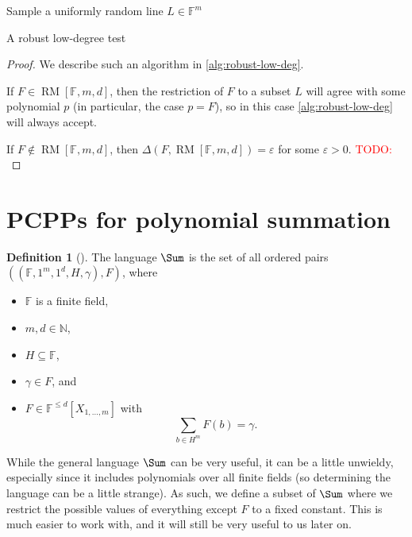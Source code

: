\documentclass[english,12pt]{reedthesis}
\theoremstyle{plain}
\theoremstyle{definition}
\newtheorem{defn}[defn]{Definition}
\theoremstyle{remark}
\DeclareMathOperator{\RM}{RM}
\DeclarePairedDelimiter{\abs}{\lvert}{\rvert}
\newcommand{\TODO}[1]{\textcolor{red}{TODO: #1}}
\begin{document}
\begin{algorithm}[htbp]
  \KwOut{Whether $F \in \RM[\mathbb{F}, m, d]$}
  Sample a uniformly random line $L \in \mathbb{F}^{m}$\;
  \caption{A robust low-degree test~\cite[Prop.\ 5.7]{Par21}}\label{alg:robust-low-deg}
\end{algorithm}

\begin{proof}
  We describe such an algorithm in \cref{alg:robust-low-deg}.

  If $F \in \RM[\mathbb{F}, m, d]$, then the restriction of $F$ to a subset $L$
  will agree with some polynomial $p$ (in particular, the case $p = F$), so in
  this case \cref{alg:robust-low-deg} will always accept.

  If $F \notin \RM[\mathbb{F}, m, d]$, then $\Delta(F, \RM[\mathbb{F}, m, d]) = \varepsilon$ for
  some $\varepsilon > 0$. \TODO{}
\end{proof}

\section{PCPPs for polynomial summation}\label{sec:pcpp-poly-sum}

\begin{defn}[{\cite[Def.\ 4.1]{GOS25}}]\label{def:sum-lang}
  The language $\Sum$ is the set of all ordered pairs
  $((\mathbb{F}, 1^{m}, 1^{d}, H, \gamma), F)$, where
  \begin{itemize}
    \item $\mathbb{F}$ is a finite field,
    \item $m, d \in \mathbb{N}$,
    \item $H \subseteq \mathbb{F}$,
    \item $\gamma \in F$, and
    \item $F \in \mathbb{F}^{\le d}[X_{1, \ldots, m}]$ with
          \[
            \sum_{b \in H^{m}}F(b) = \gamma.
          \]
  \end{itemize}
\end{defn}

While the general language $\Sum$ can be very useful, it can be a little
unwieldy, especially since it includes polynomials over all finite fields (so
determining the language can be a little strange). As such, we define a subset
of $\Sum$ where we restrict the possible values of everything except $F$ to a
fixed constant. This is much easier to work with, and it will still be very
useful to us later on.
\end{document}
